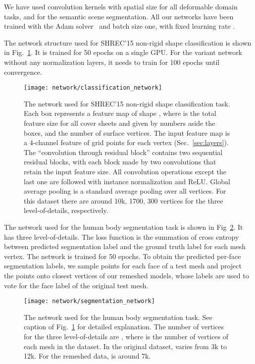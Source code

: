 \documentclass[10pt,twocolumn,letterpaper]{article}
\begin{document}
We have used convolution kernels with spatial size  for all deformable domain tasks, and  for the semantic scene segmentation.
All our networks have been trained with the Adam solver~\cite{AdamSolver} and batch size one, with fixed learning rate .

The network structure used for SHREC'15 non-rigid shape classification is shown in Fig.~\ref{fig:shrec15_network}.
It is trained for 50 epochs on a single GPU. For the variant network without any normalization layers, it needs to train for 100 epochs until convergence. 

\begin{figure}[t]
	\texttt{[image: network/classification\_network]}
	\vspace{-2mm}
	\caption{The network used for SHREC'15 non-rigid shape classification task. 
		Each box represents a feature map of shape , where  is the total feature size for all  cover sheets and given by numbers aside the boxes, and  the number of surface vertices.
		The input feature map is a 4-channel feature of  grid points for each vertex (Sec.~\ref{sec:layers}).
		The ``convolution through residual block'' contains two sequential residual blocks, with each block made by two convolutions that retain the input feature size.
		All convolution operations except the last one are followed with instance normalization and ReLU. 
		Global average pooling is a standard average pooling over all vertices.	
		For this dataset there are around 10k, 1700, 300 vertices for the three level-of-details, respectively. 
	}
	\label{fig:shrec15_network}
	\vspace{0mm}
\end{figure}

The network used for the human body segmentation task is shown in Fig~\ref{fig:human_seg_network}.
It has three level-of-details.
The loss function is the summation of cross entropy between predicted segmentation label and the ground truth label for each mesh vertex.
The network is trained for 50 epochs.
To obtain the predicted per-face segmentation labels, we sample points for each face of a test mesh and project the points onto closest vertices of our remeshed models, whose labels are used to vote for the face label of the original test mesh.

\begin{figure}[t]
	\texttt{[image: network/segmentation\_network]}
	\vspace{-2mm}
	\caption{The network used for the human body segmentation task. See caption of Fig.~\ref{fig:shrec15_network} for detailed explanation. The number of vertices for the three level-of-details are , where  is the number of vertices of each mesh in the dataset. In the original dataset,  varies from 3k to 12k. For the remeshed data,  is around 7k.}
	\label{fig:human_seg_network}
	\vspace{-2mm}
\end{figure}
\end{document}

